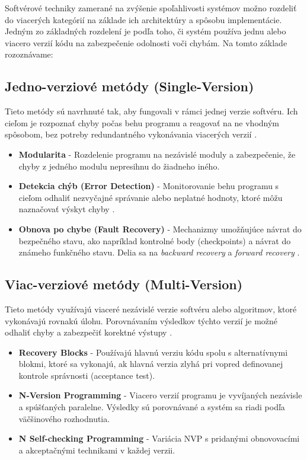 \documentclass[12pt, letterpaper, slovak]{article}
\begin{document}
Softvérové techniky zamerané na zvýšenie spoľahlivosti systémov možno rozdeliť do viacerých kategórií na základe ich architektúry a spôsobu implementácie. Jedným zo základných rozdelení je podľa toho, či systém používa jednu alebo viacero verzií kódu na zabezpečenie odolnosti voči chybám. Na tomto základe rozoznávame:

\subsection*{Jedno-verziové metódy (Single-Version)}

Tieto metódy sú navrhnuté tak, aby fungovali v rámci jednej verzie softvéru. Ich cieľom je rozpoznať chyby počas behu programu a reagovať na ne vhodným spôsobom, bez potreby redundantného vykonávania viacerých verzií \cite{nasa:sft}.

\begin{itemize}
\item \textbf{Modularita} - Rozdelenie programu na nezávislé moduly a zabezpečenie, že chyby z jedného modulu nepresihnu do žiadneho iného.
\item \textbf{Detekcia chýb (Error Detection)} - Monitorovanie behu programu s cieľom odhaliť nezvyčajné správanie alebo neplatné hodnoty, ktoré môžu naznačovať výskyt chyby \cite{nasa:sft}.
\item \textbf{Obnova po chybe (Fault Recovery)} - Mechanizmy umožňujúce návrat do bezpečného stavu, ako napríklad kontrolné body (checkpoints) a návrat do známeho funkčného stavu. Delia sa na \textit{backward recovery} a \textit{forward recovery} \cite{shubu}. 
\end{itemize}

\subsection*{Viac-verziové metódy (Multi-Version)}

Tieto metódy využívajú viaceré nezávislé verzie softvéru alebo algoritmov, ktoré vykonávajú rovnakú úlohu. Porovnávaním výsledkov týchto verzií je možné odhaliť chyby a zabezpečiť korektné výstupy \cite{nasa:sft}.

\begin{itemize}
\item \textbf{Recovery Blocks} \cite{lyu:sft} - Používajú hlavnú verziu kódu spolu s alternatívnymi blokmi, ktoré sa vykonajú, ak hlavná verzia zlyhá pri vopred definovanej kontrole správnosti (acceptance test).
\item \textbf{N-Version Programming} \cite{aa:nvp} - Viacero verzií programu je vyvíjaných nezávisle a spúšťaných paralelne. Výsledky sú porovnávané a systém sa riadi podľa väčšinového rozhodnutia.
\item \textbf{N Self-checking Programming} \cite{nscp} - Variácia NVP s pridanými obnovovacími a akceptačnými technikami v každej verzii.
\end{itemize}
\end{document}
